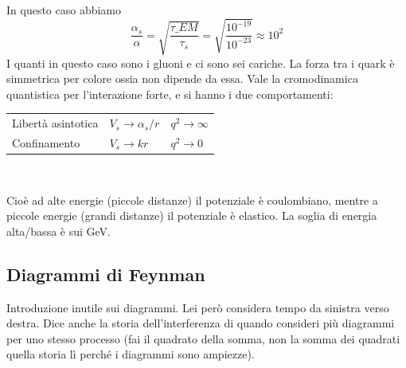 \begin{itemize}
\begin{enumerate}
    In questo caso abbiamo 
    \begin{equation*}
    \frac{\alpha_s}\alpha=\sqrt{\frac{\tau\_{EM}}{\tau_s}}=\sqrt{\frac{10^{-19}}{10^{-23}}}\approx10^2
    \end{equation*}
    I quanti in questo caso sono i gluoni e ci sono sei cariche. La forza tra i quark è simmetrica per colore ossia non dipende da essa. Vale la cromodinamica quantistica per l'interazione forte, e si hanno i due comportamenti: 
    \\
    \begin{center}
    \begin{tabular}{>{\centering\arraybackslash}m{3cm} >{\centering\arraybackslash}m{3cm} >{\centering\arraybackslash}m{3cm}}
        Libertà asintotica & $V_s\to\alpha_s/r$ & $q^2\to\infty$\\
        Confinamento & $V_s\to kr$ & $q^2\to0$\\
    \end{tabular}\\
    \end{center}
    Cioè ad alte energie (piccole distanze) il potenziale è coulombiano, mentre a piccole energie (grandi distanze) il potenziale è elastico. La soglia di energia alta/bassa è sui GeV.
\end{enumerate}
\end{itemize}
\subsection{Diagrammi di Feynman}
Introduzione inutile sui diagrammi. Lei però considera tempo da sinistra verso destra. Dice anche la storia dell'interferenza di quando consideri più diagrammi per uno stesso processo (fai il quadrato della somma, non la somma dei quadrati quella storia lì perché i diagrammi sono ampiezze).
